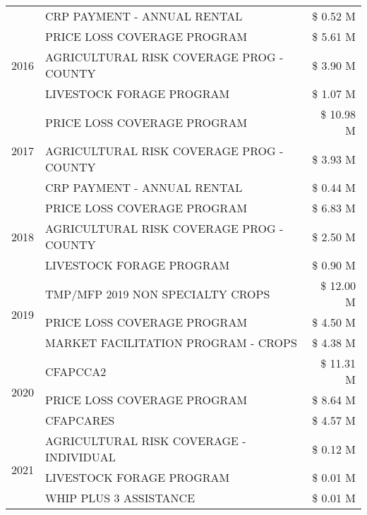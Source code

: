 \begin{tabular}{llr}
 & CRP PAYMENT - ANNUAL RENTAL & \$ 0.52 M \\
\cline{1-3}
\multirow[t]{3}{*}{2016} & PRICE LOSS COVERAGE PROGRAM & \$ 5.61 M \\
 & AGRICULTURAL RISK COVERAGE PROG - COUNTY & \$ 3.90 M \\
 & LIVESTOCK FORAGE PROGRAM & \$ 1.07 M \\
\cline{1-3}
\multirow[t]{3}{*}{2017} & PRICE LOSS COVERAGE PROGRAM & \$ 10.98 M \\
 & AGRICULTURAL RISK COVERAGE PROG - COUNTY & \$ 3.93 M \\
 & CRP PAYMENT - ANNUAL RENTAL & \$ 0.44 M \\
\cline{1-3}
\multirow[t]{3}{*}{2018} & PRICE LOSS COVERAGE PROGRAM & \$ 6.83 M \\
 & AGRICULTURAL RISK COVERAGE PROG - COUNTY & \$ 2.50 M \\
 & LIVESTOCK FORAGE PROGRAM & \$ 0.90 M \\
\cline{1-3}
\multirow[t]{3}{*}{2019} & TMP/MFP 2019 NON SPECIALTY CROPS & \$ 12.00 M \\
 & PRICE LOSS COVERAGE PROGRAM & \$ 4.50 M \\
 & MARKET FACILITATION PROGRAM - CROPS & \$ 4.38 M \\
\cline{1-3}
\multirow[t]{3}{*}{2020} & CFAPCCA2 & \$ 11.31 M \\
 & PRICE LOSS COVERAGE PROGRAM & \$ 8.64 M \\
 & CFAPCARES & \$ 4.57 M \\
\cline{1-3}
\multirow[t]{3}{*}{2021} & AGRICULTURAL RISK COVERAGE - INDIVIDUAL & \$ 0.12 M \\
 & LIVESTOCK FORAGE PROGRAM & \$ 0.01 M \\
 & WHIP PLUS 3 ASSISTANCE & \$ 0.01 M \\
\cline{1-3}
\bottomrule
\end{tabular}
